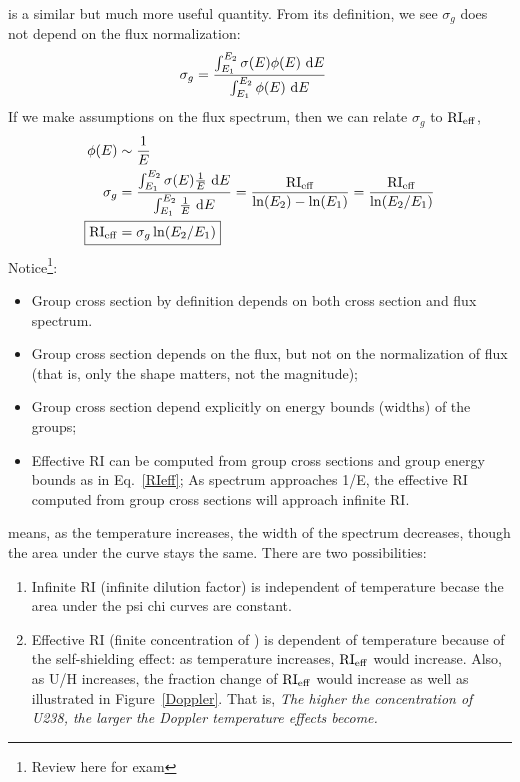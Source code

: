 \documentclass{school-22.211-notes}
\begin{document}
 is a similar but much more useful quantity. From its definition, we see $\sigma_g$ does not depend on the flux normalization: 
\begin{align}
\sigma_g &= \frac{\int_{E_1}^{E_2} \sigma(E) \phi(E) \mbox{ }\mathrm{d} E }{\int_{E_1}^{E_2} \phi(E) \mbox{ }\mathrm{d} E} 
\end{align}
If we make assumptions on the flux spectrum, then we can relate $\sigma_g$ to $\mathrm{RI}_{\mathrm{eff}}$,
\begin{align}
\phi(E) &\sim \frac{1}{E} \\
\sigma_g &= \frac{\int_{E_1}^{E_2} \sigma(E) \frac{1}{E} \dE }{\int_{E_1}^{E_2} \frac{1}{E} \dE} 
= \frac{\RI_{\eff}}{\ln(E_2) - \ln(E_1)}  
= \frac{\RI_{\eff}}{\ln(E_2/E_1)} \\
\Aboxed{\RI_{\eff} &= \sigma_g \ln(E_2/E_1) } \label{RIeff}
\end{align}
Notice\footnote{Review here for exam}:
\begin{itemize}
\item Group cross section by definition depends on both cross section and flux spectrum. 
\item Group cross section depends on the flux, but not on the normalization of flux (that is, only the shape matters, not the magnitude);
\item Group cross section depend explicitly on energy bounds (widths) of the groups; 
\item Effective RI can be computed from group cross sections and group energy bounds as in Eq.~\ref{RIeff}; As spectrum approaches 1/E, the effective RI computed from group cross sections will approach infinite RI. 
\end{itemize}

 means, as the temperature increases, the width of the spectrum decreases, though the area under the curve stays the same. There are two possibilities: 
\begin{enumerate}
\item Infinite RI (infinite dilution factor) is independent of temperature becase the area under the psi chi curves are constant. 
\item Effective RI (finite concentration of ) is dependent of temperature because of the self-shielding effect: as temperature increases, $\mathrm{RI}_{\mathrm{eff}}$ would increase. Also, as U/H increases, the fraction change of $\mathrm{RI}_{\mathrm{eff}}$ would increase as well as illustrated in Figure~\ref{Doppler}. That is, \textit{The higher the concentration of U238, the larger the Doppler temperature effects become.}
\end{enumerate}
\end{document}
